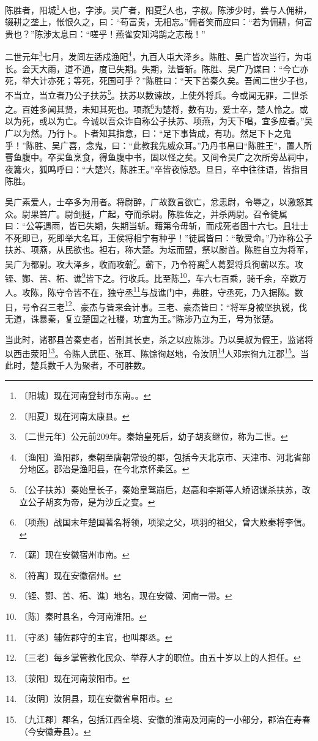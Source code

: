 \documentclass[12pt,UTF-8,openany]{ctexbook}
\begin{document}
\begin{normalsize}
    
    陈胜者，阳城\footnote{〔阳城〕现在河南登封市东南。。}人也，字涉。吴广者，阳夏\footnote{〔阳夏〕现在河南太康县。}人也，字叔。陈涉少时，尝与人佣耕，辍耕之垄上，怅恨久之，曰：“苟富贵，无相忘。”佣者笑而应曰：“若为佣耕，何富贵也？”陈涉太息曰：“嗟乎！燕雀安知鸿鹄之志哉！”
    
    二世元年\footnote{〔二世元年〕公元前209年。秦始皇死后，幼子胡亥继位，称为二世。}七月，发闾左适戍渔阳\footnote{〔渔阳〕渔阳郡，秦朝至唐朝常设的郡，包括今天北京市、天津市、河北省部分地区。郡治是渔阳县，在今北京怀柔区。}，九百人屯大泽乡。陈胜、吴广皆次当行，为屯长。会天大雨，道不通，度已失期。失期，法皆斩。陈胜、吴广乃谋曰：“今亡亦死，举大计亦死；等死，死国可乎？”陈胜曰：“天下苦秦久矣。吾闻二世少子也，不当立，当立者乃公子扶苏\footnote{〔公子扶苏〕秦始皇长子，秦始皇驾崩后，赵高和李斯等人矫诏谋杀扶苏，改立公子胡亥为帝，是为沙丘之变。}。扶苏以数谏故，上使外将兵。今或闻无罪，二世杀之。百姓多闻其贤，未知其死也。项燕\footnote{〔项燕〕战国末年楚国著名将领，项梁之父，项羽的祖父，曾大败秦将李信。}为楚将，数有功，爱士卒，楚人怜之。或以为死，或以为亡。今诚以吾众诈自称公子扶苏、项燕，为天下唱，宜多应者。”吴广以为然。乃行卜。卜者知其指意，曰：“足下事皆成，有功。然足下卜之鬼乎！”陈胜、吴广喜，念鬼，曰：“此教我先威众耳。”乃丹书帛曰“陈胜王”，置人所罾鱼腹中。卒买鱼烹食，得鱼腹中书，固以怪之矣。又间令吴广之次所旁丛祠中，夜篝火，狐鸣呼曰：“大楚兴，陈胜王。”卒皆夜惊恐。旦日，卒中往往语，皆指目陈胜。
    
    吴广素爱人，士卒多为用者。将尉醉，广故数言欲亡，忿恚尉，令辱之，以激怒其众。尉果笞广。尉剑挺，广起，夺而杀尉。陈胜佐之，并杀两尉。召令徒属曰：“公等遇雨，皆已失期，失期当斩。藉第令毋斩，而戍死者固十六七。且壮士不死即已，死即举大名耳，王侯将相宁有种乎！”徒属皆曰：“敬受命。”乃诈称公子扶苏、项燕，从民欲也。袒右，称大楚。为坛而盟，祭以尉首。陈胜自立为将军，吴广为都尉。攻大泽乡，收而攻蕲\footnote{〔蕲〕现在安徽宿州市南。}。蕲下，乃令符离\footnote{〔符离〕现在安徽宿州。}人葛婴将兵徇蕲以东。攻铚、酂、苦、柘、谯\footnote{〔铚、酂、苦、柘、谯〕地名，现在安徽、河南一带。}皆下之。行收兵。比至陈\footnote{〔陈〕秦时县名，今河南淮阳。}，车六七百乘，骑千余，卒数万人。攻陈，陈守令皆不在，独守丞\footnote{〔守丞〕辅佐郡守的主官，也叫郡丞。}与战谯门中，弗胜，守丞死，乃入据陈。数日，号令召三老\footnote{〔三老〕每乡掌管教化民众、举荐人才的职位。由五十岁以上的人担任。}、豪杰与皆来会计事。三老、豪杰皆曰：“将军身被坚执锐，伐无道，诛暴秦，复立楚国之社稷，功宜为王。”陈涉乃立为王，号为张楚。
    
    当此时，诸郡县苦秦吏者，皆刑其长吏，杀之以应陈涉。乃以吴叔为假王，监诸将以西击荥阳\footnote{〔荥阳〕现在河南荥阳市。}。令陈人武臣、张耳、陈馀徇赵地，令汝阴\footnote{〔汝阴〕汝阴县，现在安徽省阜阳市。}人邓宗徇九江郡\footnote{〔九江郡〕郡名，包括江西全境、安徽的淮南及河南的一小部分，郡治在寿春（今安徽寿县）。}。当此时，楚兵数千人为聚者，不可胜数。
\end{normalsize}
\end{document}
